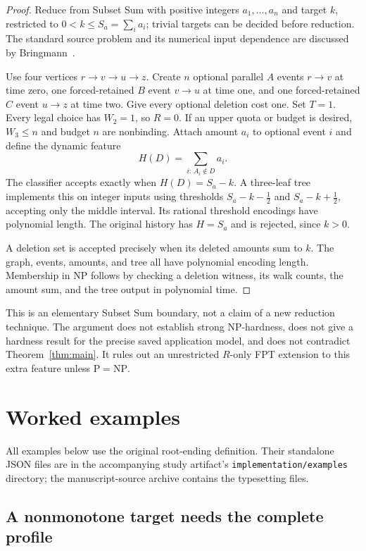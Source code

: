 \documentclass[11pt]{article}
\theoremstyle{remark}
\begin{document}
\begin{proof}
Reduce from Subset Sum with positive integers $a_1,\ldots,a_n$ and target
$k$, restricted to $0<k\le S_a=\sum_i a_i$; trivial targets can be decided
before reduction. The standard source problem and its numerical input
dependence are discussed by Bringmann~\citep{bringmann2017}.

Use four vertices $r\to v\to u\to z$. Create $n$ optional parallel $A$ events
$r\to v$ at time zero, one forced-retained $B$ event $v\to u$ at time one,
and one forced-retained $C$ event $u\to z$ at time two. Give every optional
deletion cost one. Set $T=1$. Every legal choice has $W_2=1$, so $R=0$.
If an upper quota or budget is desired, $W_3\le n$ and budget $n$ are
nonbinding. Attach amount $a_i$ to optional event $i$ and define the dynamic
feature
\[
 H(D)=\sum_{i:\,A_i\notin D}a_i.
\]
The classifier accepts exactly when $H(D)=S_a-k$. A three-leaf tree implements
this on integer inputs using thresholds $S_a-k-\tfrac12$ and
$S_a-k+\tfrac12$, accepting only the middle interval. Its rational threshold
encodings have polynomial length. The original history has $H=S_a$ and is
rejected, since $k>0$.

A deletion set is accepted precisely when its deleted amounts sum to $k$.
The graph, events, amounts, and tree all have polynomial encoding length.
Membership in NP follows by checking a deletion witness, its walk counts,
the amount sum, and the tree output in polynomial time.
\end{proof}

This is an elementary Subset Sum boundary, not a claim of a new reduction
technique. The argument does not establish strong NP-hardness, does not give
a hardness result for the precise saved application model, and does not
contradict Theorem~\ref{thm:main}. It rules out an unrestricted $R$-only FPT
extension to this extra feature unless $\mathrm{P}=\mathrm{NP}$.

\section{Worked examples}\label{sec:examples}

All examples below use the original root-ending definition. Their standalone
JSON files are in the accompanying study artifact's
\texttt{implementation/examples} directory; the manuscript-source archive
contains the typesetting files.

\subsection{A nonmonotone target needs the complete profile}
\end{document}
